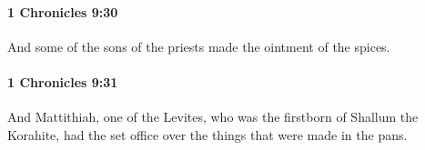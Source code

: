 		\paragraph{1 Chronicles 9:30} %
			\label{1CHRONICLES-9-30}

			And some of the sons of the priests made the ointment of the spices.


		\paragraph{1 Chronicles 9:31} %
			\label{1CHRONICLES-9-31}

			And Mattithiah, one of the Levites, who was the firstborn of Shallum the Korahite, had the set office over the things that were made in the pans.


